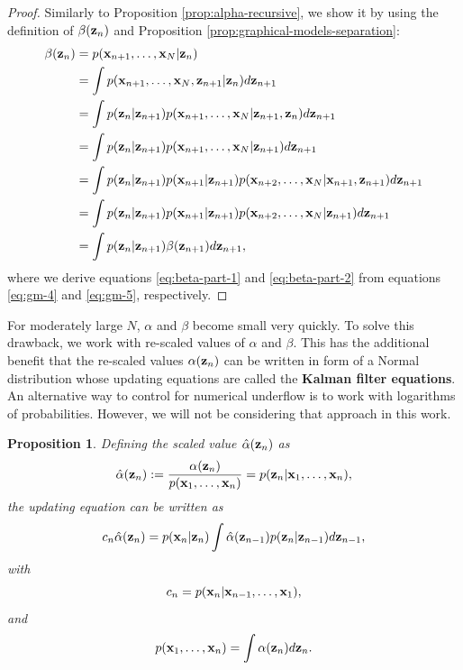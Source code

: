 \documentclass[12pt, oneside]{book}
\numberwithin{equation}{section}
\newcommand{\x}{{\bf x}}
\newcommand{\z}{{\bf z}}
\newtheorem{proposition}{Proposition}[section]
\begin{document}
{\begin{proof}
	Similarly to Proposition \ref{prop:alpha-recursive}, we show it by using the definition of $\beta(\z_n)$ and Proposition \ref{prop:graphical-models-separation}:
	\begin{align}
		\beta(\z_n) &= p(\x_{n+1}, \ldots, \x_N \vert \z_n)\\
		&= \int p(\x_{n+1}, \ldots, \x_N, \z_{n+1} \vert \z_n) d\z_{n+1} \\
		&= \int p(\z_n \vert \z_{n+1}) p(\x_{n+1}, \ldots, \x_N \vert \z_{n+1}, \z_n) d\z_{n+1} \\
		&= \int p(\z_n \vert \z_{n+1}) p(\x_{n+1}, \ldots, \x_N \vert \z_{n+1}) d\z_{n+1} \label{eq:beta-part-1} \\
		&= \int p(\z_n \vert \z_{n+1}) p(\x_{n+1} \vert \z_{n+1}) p(\x_{n+2}, \ldots, \x_N \vert \x_{n+1}, \z_{n+1}) d\z_{n+1} \\
		&= \int p(\z_n \vert \z_{n+1}) p(\x_{n+1} \vert \z_{n+1}) p(\x_{n+2}, \ldots, \x_N \vert \z_{n+1}) d\z_{n+1} \label{eq:beta-part-2}\\
		&= \int p(\z_n \vert \z_{n+1}) \beta(\z_{n+1}) d\z_{n+1},
	\end{align}
	where we derive equations \eqref{eq:beta-part-1} and \eqref{eq:beta-part-2} from equations \eqref{eq:gm-4} and \eqref{eq:gm-5}, respectively.
\end{proof}

For moderately large $N$, $\alpha$ and $\beta$ become small very quickly. To solve this drawback, we work with re-scaled values of $\alpha$ and $\beta$. This has the additional benefit that the re-scaled values $\alpha(\z_n)$ can be written in form of a Normal distribution whose updating equations are  called the \textbf{Kalman filter equations}. An alternative way to control for numerical underflow is to work with logarithms of probabilities. However, we will not be considering that approach in this work.


\begin{proposition} \label{prop:alpha-hat}
	Defining the scaled value $\hat\alpha(\z_n)$ as
	\begin{equation}
		\hat\alpha(\z_n) := \frac{\alpha(\z_n)}{p(\x_1, \ldots, \x_n)} = p(\z_n \vert \x_1, \ldots, \x_n),
	\end{equation}
	the updating equation can be written as
	\begin{equation}
		 c_n \hat\alpha(\z_n) = p(\x_n\vert\z_n)\int \hat\alpha(\z_{n-1})p(\z_n \vert \z_{n-1}) d\z_{n-1},
	\end{equation}
	with
	\begin{equation}
		c_n = p(\x_n \vert \x_{n-1}, \ldots, \x_1),
	\end{equation}
	and
	\begin{equation}
		p(\x_1, \ldots, \x_n) = \int \alpha(\z_n) d\z_n.\\
	\end{equation}
\end{proposition}

}
\end{document}
